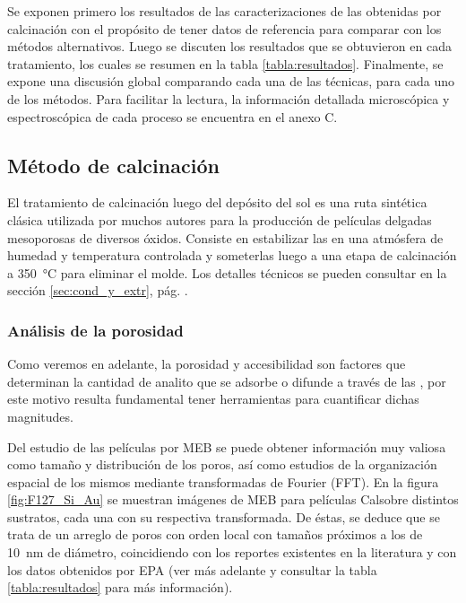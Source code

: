 		 Se exponen primero los resultados de las caracterizaciones de las \pdm\space obtenidas por calcinación con el propósito de tener datos de referencia para comparar con los métodos alternativos. Luego se discuten los resultados que se obtuvieron en cada tratamiento, los cuales se resumen en la tabla \ref{tabla:resultados}. Finalmente, se expone una discusión global comparando cada una de las técnicas, para cada uno de los métodos. Para facilitar la lectura, la información detallada microscópica y espectroscópica de cada proceso se encuentra en el anexo C.
	 
	  \subsection{Método de calcinación}\label{sub:m_todo_de_calcinaci_n}
	 	
	 		El tratamiento de calcinación luego del depósito del sol es una ruta sintética clásica utilizada por muchos autores para la producción de películas delgadas mesoporosas de diversos óxidos\cite{Soler-Illia2002a,Brinker1999,Soler-Illia2006,Grosso2004,Innocenzi2013,angelome2011}. Consiste en estabilizar las \pdm\space en una atmósfera de humedad y temperatura controlada y someterlas luego a una etapa de calcinación a \SI{350}{\celsius} para eliminar el molde. Los detalles técnicos se pueden consultar en la sección \ref{sec:cond_y_extr}, pág. \pageref{sec:cond_y_extr}.

	 	\subsubsection{Análisis de la porosidad}

		 Como veremos en adelante, la porosidad y accesibilidad son factores que determinan la cantidad de analito que se adsorbe o difunde a través de las \pdm, por este motivo resulta fundamental tener herramientas para cuantificar dichas magnitudes. 

		 Del estudio de las películas por MEB se puede obtener información muy valiosa como tamaño y distribución de los poros, así como estudios de la organización espacial de los mismos mediante transformadas de Fourier (FFT). En la figura \ref{fig:F127_Si_Au} se muestran imágenes de MEB para películas Cal\pdmF\space sobre distintos sustratos, cada una con su respectiva transformada. De éstas, se deduce que se trata de un arreglo de poros con orden local con tamaños próximos a los de \SI{10}{\nm} de diámetro, coincidiendo con los reportes  existentes en la literatura\cite{urade2005,angelome2011,lee2006} y con los datos obtenidos por EPA (ver más adelante y consultar la tabla \ref{tabla:resultados} para más información).  

